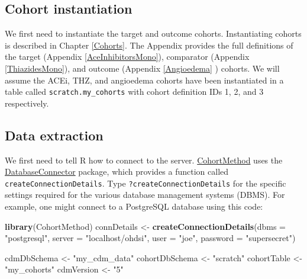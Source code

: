 \documentclass[11pt]{book}
\newenvironment{Shaded}{\begin{snugshade}}{\end{snugshade}}
\newcommand{\DataTypeTok}[1]{\textcolor[rgb]{0.13,0.29,0.53}{#1}}
\newcommand{\KeywordTok}[1]{\textcolor[rgb]{0.13,0.29,0.53}{\textbf{#1}}}
\newcommand{\NormalTok}[1]{#1}
\newcommand{\StringTok}[1]{\textcolor[rgb]{0.31,0.60,0.02}{#1}}
\theoremstyle{definition}
\theoremstyle{definition}
\theoremstyle{definition}
\theoremstyle{remark}
\begin{document}
\hypertarget{cohort-instantiation-1}{%
\subsection{Cohort instantiation}\label{cohort-instantiation-1}}

We first need to instantiate the target and outcome cohorts. Instantiating cohorts is described in Chapter \ref{Cohorts}. The Appendix provides the full definitions of the target (Appendix \ref{AceInhibitorsMono}), comparator (Appendix \ref{ThiazidesMono}), and outcome (Appendix \ref{Angioedema} ) cohorts. We will assume the ACEi, THZ, and angioedema cohorts have been instantiated in a table called \texttt{scratch.my\_cohorts} with cohort definition IDs 1, 2, and 3 respectively.

\hypertarget{data-extraction-1}{%
\subsection{Data extraction}\label{data-extraction-1}}

We first need to tell R how to connect to the server. \href{https://ohdsi.github.io/CohortMethod/}{CohortMethod} uses the \href{https://ohdsi.github.io/DatabaseConnector/}{DatabaseConnector} package, which provides a function called \texttt{createConnectionDetails}. Type \texttt{?createConnectionDetails} for the specific settings required for the various database management systems (DBMS). For example, one might connect to a PostgreSQL database using this code:

\begin{Shaded}
\begin{Highlighting}[]
\KeywordTok{library}\NormalTok{(CohortMethod)}
\NormalTok{connDetails <-}\StringTok{ }\KeywordTok{createConnectionDetails}\NormalTok{(}\DataTypeTok{dbms =} \StringTok{"postgresql"}\NormalTok{,}
                                       \DataTypeTok{server =} \StringTok{"localhost/ohdsi"}\NormalTok{,}
                                       \DataTypeTok{user =} \StringTok{"joe"}\NormalTok{,}
                                       \DataTypeTok{password =} \StringTok{"supersecret"}\NormalTok{)}

\NormalTok{cdmDbSchema <-}\StringTok{ "my_cdm_data"}
\NormalTok{cohortDbSchema <-}\StringTok{ "scratch"}
\NormalTok{cohortTable <-}\StringTok{ "my_cohorts"}
\NormalTok{cdmVersion <-}\StringTok{ "5"}
\end{Highlighting}
\end{Shaded}
\end{document}
